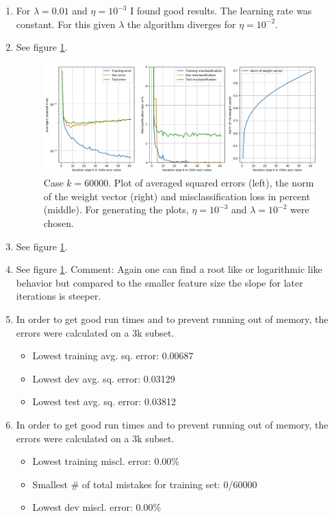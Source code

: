 \documentclass[12pt]{article}
\begin{document}
\begin{enumerate}
	\item For $\lambda=0.01$ and $\eta=10^{-3}$ I found good results. The learning rate was constant. For this given $\lambda$ the algorithm diverges for $\eta=10^{-2}$.
	\item See figure \ref{fig:5.2}.
	\begin{figure}[b]
		\centering
		\includegraphics[width=\linewidth]{./Problem_5/Problem_5.2.png}
		\caption{Case $k=60000$. Plot of averaged squared errors (left), the norm of the weight vector (right) and misclassification loss in percent (middle). For generating the plots, $\eta = 10^{-3}$ and $\lambda=10^{-2}$ were chosen.}
		\label{fig:5.2}
	\end{figure}
	\item See figure \ref{fig:5.2}.
	\item See figure \ref{fig:5.2}. Comment: Again one can find a root like or logarithmic like behavior but compared to the smaller feature size the slope for later iterations is steeper. 
	\item 
	In order to get good run times and to prevent running out of memory, the errors were calculated on a 3k subset.
	\begin{itemize}
		\item Lowest training avg. sq. error: 0.00687
		\item Lowest dev avg. sq. error: 0.03129
		\item Lowest test avg. sq. error: 0.03812
	\end{itemize}
	\item
	In order to get good run times and to prevent running out of memory, the errors were calculated on a 3k subset.
	\begin{itemize}
		\item Lowest training miscl. error: 0.00\%
		\item Smallest \# of total mistakes for training set: 0/60000
		\item Lowest dev miscl. error: 0.00\%

\end{itemize}
\end{enumerate}
\end{document}
